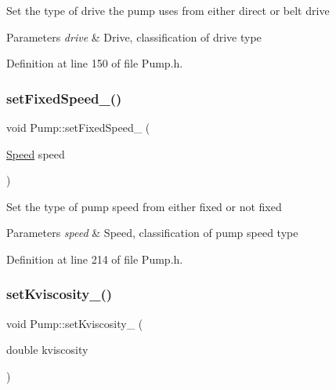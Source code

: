 Set the type of drive the pump uses from either direct or belt drive 
\begin{DoxyParams}{Parameters}
{\em drive} & Drive, classification of drive type \\
\hline
\end{DoxyParams}


Definition at line 150 of file Pump.\+h.

\mbox{\label{class_pump_a9e74b484f468a14076fb12d8b991e24b}} 
\subsubsection{\texorpdfstring{set\+Fixed\+Speed\+\_\+()}{setFixedSpeed\_()}}
{\footnotesize\ttfamily void Pump\+::set\+Fixed\+Speed\+\_\+ (\begin{DoxyParamCaption}\item[{\hyperlink{class_pump_ae443603074ebca82f0b89209482d10b6}{Speed}}]{speed }\end{DoxyParamCaption})\hspace{0.3cm}{\ttfamily [inline]}}

Set the type of pump speed from either fixed or not fixed 
\begin{DoxyParams}{Parameters}
{\em speed} & Speed, classification of pump speed type \\
\hline
\end{DoxyParams}


Definition at line 214 of file Pump.\+h.

\mbox{\label{class_pump_a26d1d10908f91137f5148540ceb6520a}} 
\subsubsection{\texorpdfstring{set\+Kviscosity\+\_\+()}{setKviscosity\_()}}
{\footnotesize\ttfamily void Pump\+::set\+Kviscosity\+\_\+ (\begin{DoxyParamCaption}\item[{double}]{kviscosity }\end{DoxyParamCaption})\hspace{0.3cm}{\ttfamily [inline]}}

